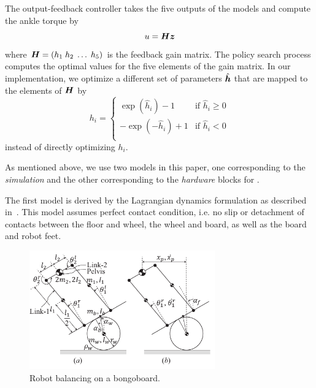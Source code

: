 The output-feedback controller takes the five outputs of the models and
compute the ankle torque by
\begin{equation}
u = \mbox{\boldmath \(H\)} \mbox{\boldmath \(z\)}
\end{equation}
where $\mbox{\boldmath \(H\)} = \left(h_1\; h_2\; \ldots\; h_5\right)$ is the
feedback gain matrix.
The policy search process computes the optimal values for the five
elements of the gain matrix. 
In our implementation, we optimize a different set of parameters
$\hat{\mbox{\boldmath \(h\)}}$ that are mapped to the elements of $\mbox{\boldmath \(H\)}$ by 
\begin{equation}
h_i = \left\{ 
\begin{array}{cc}
\exp(\hat{h}_i)-1 & \mbox{if }\hat{h}_i \geq 0 \\
-\exp(-\hat{h}_i)+1 & \mbox{if }\hat{h}_i < 0 \\
\end{array}
\right.
\end{equation}
instead of directly optimizing $h_i$.

As mentioned above, we use two models in this paper, one corresponding
to the {\em simulation} and the other corresponding to the {\em
hardware} blocks for .

The first model is derived by the Lagrangian dynamics formulation as
described in~\cite{bib-icra14-universal}.  This model assumes perfect
contact condition, i.e. no slip or detachment of contacts between the
floor and wheel, the wheel and board, as well as the board and robot
feet.

\begin{figure}[tb]
\begin{center}
\includegraphics[width=80mm]{eps/dynamicModelNOutputs.pdf}
\caption{Robot balancing on a bongoboard.}
\label{fig:learning_bongoboard}
\end{center}
\end{figure}


